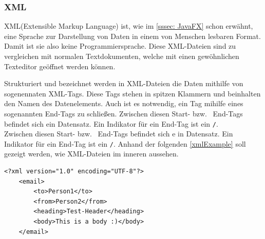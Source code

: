 \subsubsection{XML}
XML(Extensible Markup Language) ist, wie im \autoref{sssec: JavaFX} schon erwähnt, eine Sprache zur Darstellung von Daten in einem von Menschen lesbaren Format.
Damit ist sie also keine Programmiersprache.
Diese XML-Dateien sind zu vergleichen mit normalen Textdokumenten, welche mit einen gewöhnlichen Texteditor geöffnet werden können.

Strukturiert und bezeichnet werden in XML-Dateien die Daten mithilfe von sogenennaten XML-Tags.
Diese Tags stehen in spitzen Klammern und beinhalten den Namen des Datenelements.
Auch ist es notwendig, ein Tag mihilfe eines sogenannten End-Tags zu schließen.
Zwischen diesen Start- bzw. \ End-Tags befindet sich ein Datensatz.
Ein Indikator für ein End-Tag ist ein \lstinline{/}.\\
Zwischen diesen Start- bzw. \ End-Tags befindet sich e
in Datensatz.
Ein Indikator für ein End-Tag ist ein \lstinline{/}.
Anhand der folgenden \autoref{xmlExample} soll gezeigt werden, wie XML-Dateien im inneren aussehen.
\begin{lstlisting}[style=XML,caption=XML-Codebeispiel,label=xmlExample]
<?xml version="1.0" encoding="UTF-8"?>
    <email>
        <to>Person1</to>
        <from>Person2</from>
        <heading>Test-Header</heading>
        <body>This is a body :)</body>
    </email>
\end{lstlisting}
